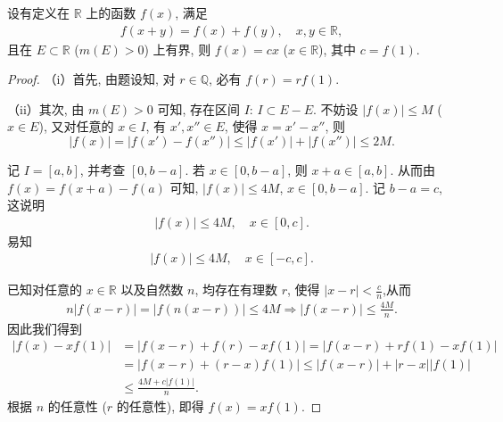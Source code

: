 \documentclass[../../main.tex]{subfiles}%
\begin{document}
\begin{proposition}\label{proposition:存在某个正测集的Cauchy方程函数必是线性函数}
设有定义在 $\mathbb{R}$ 上的函数 $f(x)$, 满足
\begin{align*}
f(x + y) = f(x) + f(y),\quad x,y\in\mathbb{R},
\end{align*}
且在 $E\subset\mathbb{R}$ ($m(E)>0$) 上有界, 则 $f(x)=cx$ ($x\in\mathbb{R}$), 其中 $c = f(1)$.
\end{proposition}
\begin{proof}

（i）首先, 由题设知, 对 $r\in\mathbb{Q}$, 必有 $f(r)=rf(1)$.

（ii）其次, 由 $m(E)>0$ 可知, 存在区间 $I$: $I\subset E - E$. 不妨设 $|f(x)|\leqslant M$ ($x\in E$), 又对任意的 $x\in I$, 有 $x',x''\in E$, 使得 $x = x' - x''$, 则
\[
|f(x)| = |f(x') - f(x'')|\leqslant |f(x')| + |f(x'')|\leqslant 2M.
\]

记 $I = [a,b]$, 并考查 $[0,b - a]$. 若 $x\in [0,b - a]$, 则 $x + a\in [a,b]$. 从而由 $f(x) = f(x + a) - f(a)$ 可知, $|f(x)|\leqslant 4M$, $x\in [0,b - a]$. 记 $b - a = c$, 这说明
\begin{align*}
|f(x)|\leqslant 4M,\quad x\in [0,c].
\end{align*}
易知
\begin{align*}
|f(x)|\leqslant 4M,\quad x\in [-c,c].
\end{align*}

已知对任意的 $x\in\mathbb{R}$ 以及自然数 $n$, 均存在有理数 $r$, 使得 $|x - r|<\frac{c}{n}$,从而
\begin{align*}
n\left| f\left( x-r \right) \right|=\left| f\left( n\left( x-r \right) \right) \right|\leqslant 4M\Longrightarrow \left| f\left( x-r \right) \right|\leqslant \frac{4M}{n}.
\end{align*}
因此我们得到
\begin{align*}
|f(x)-xf(1)|&=\left| f\left( x-r \right) +f\left( r \right) -xf\left( 1 \right) \right|=\left| f\left( x-r \right) +rf\left( 1 \right) -xf\left( 1 \right) \right|
\\
&=\left| f\left( x-r \right) +\left( r-x \right) f\left( 1 \right) \right|\leqslant \left| f\left( x-r \right) \right|+\left| r-x \right|\left| f\left( 1 \right) \right|
\\
&\leqslant \frac{4M+c|f(1)|}{n}.
\end{align*}
根据 $n$ 的任意性 ($r$ 的任意性), 即得 $f(x)=xf(1)$. 
\end{proof}
\end{document}
